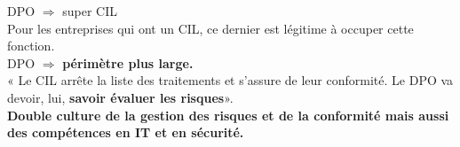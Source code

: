 \documentclass[a4paper,11pt]{report}
\begin{document}
DPO $\Rightarrow$ super CIL\\
Pour les entreprises qui ont un CIL, ce dernier est légitime à occuper cette fonction.\\
DPO $\Rightarrow$ \textbf{périmètre plus large.}\\
« Le CIL arrête la liste des traitements et s’assure de leur conformité. Le DPO va devoir, lui, \textbf{savoir évaluer les risques}».\\

\textbf{Double culture de la gestion des risques et de la conformité mais aussi des compétences en IT et en sécurité.}
\end{document}
